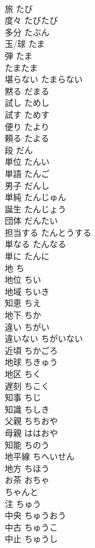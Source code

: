 \documentclass[8pt]{extreport}
\begin{document}
\begin{CJK}{UTF8}{min}
\\	旅	たび	
\\	度々	たびたび	
\\	多分	たぶん	
\\	玉/球	たま	
\\	弾	たま	
\\	たまたま		
\\	堪らない	たまらない	
\\	黙る	だまる	
\\	試し	ためし	
\\	試す	ためす	
\\	便り	たより	
\\	頼る	たよる	
\\	段	だん	
\\	単位	たんい	
\\	単語	たんご	
\\	男子	だんし	
\\	単純	たんじゅん	
\\	誕生	たんじょう	
\\	団体	だんたい	
\\	担当する	たんとうする	
\\	単なる	たんなる	
\\	単に	たんに	
\\	地	ち	
\\	地位	ちい	
\\	地域	ちいき	
\\	知恵	ちえ	
\\	地下	ちか	
\\	違い	ちがい	
\\	違いない	ちがいない	
\\	近頃	ちかごろ	
\\	地球	ちきゅう	
\\	地区	ちく	
\\	遅刻	ちこく	
\\	知事	ちじ	
\\	知識	ちしき	
\\	父親	ちちおや	
\\	母親	ははおや	
\\	知能	ちのう	
\\	地平線	ちへいせん	
\\	地方	ちほう	
\\	お茶	おちゃ	
\\	ちゃんと		
\\	注	ちゅう	
\\	中央	ちゅうおう	
\\	中古	ちゅうこ	
\\	中止	ちゅうし	

\end{CJK}
\end{document}
